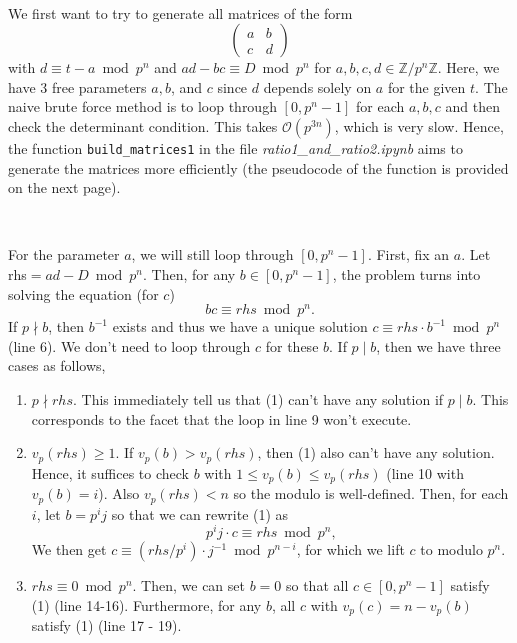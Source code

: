 \documentclass[letterpaper,12pt]{article}
\newcommand{\Z}{\mathbb{Z}}
\newcommand{\bigO}{\mathcal{O}}
\begin{document}
\

We first want to try to generate all matrices of the form 
\[
\begin{pmatrix}
a & b \\ c & d
\end{pmatrix}
\]
with $d \equiv t - a \bmod p^n$ and $ad - bc \equiv D \bmod p^n$ 
for $a,b,c,d \in \Z/p^n\Z$.
Here, we have 3 free parameters $a,b$, and $c$ since $d$ depends solely on $a$ for the given $t$.
The naive brute force method is to loop
through $[0, p^n-1]$ for each $a,b,c$ and then check the determinant condition.
This takes $\bigO(p^{3n})$, which is very slow.
Hence, the function \texttt{build\_matrices1} in the file 
\emph{ratio1\_and\_ratio2.ipynb} aims to 
generate the matrices more efficiently 
(the pseudocode of the function is provided on the next page).

\

For the parameter $a$, we will still loop through $[0, p^n-1]$.
First, fix an $a$.
Let rhs$ = ad-D \bmod p^n$.
Then, for any $b \in [0, p^n-1]$,
the problem turns into solving the equation (for $c$)
\begin{equation}
bc \equiv rhs \bmod p^n .
\end{equation}
If $p \nmid b$, then $b^{-1}$ exists and thus 
we have a unique solution
$c \equiv rhs \cdot b^{-1} \bmod p^n$ (line 6).
We don't need to loop through $c$ for these $b$.
If $p \mid b$, then we have three cases as follows,

\begin{enumerate}
\item $p \nmid rhs$. This immediately tell us that (1) can't have any solution 
if $p \mid b$. This corresponds to the facet that the loop in line 9 won't execute.

\item $v_p(rhs) \geq 1$.
If $v_p(b) > v_p(rhs)$, then (1) also can't have any solution.
Hence, it suffices to check $b$ with $1 \leq v_p(b) \leq v_p(rhs)$ (line 10 with $v_p(b) = i$).
Also $v_p(rhs) < n$ so the modulo is well-defined.
Then, for each $i$, let $b = p^i j$ so that we can rewrite (1) as 
\[
p^i j \cdot c \equiv rhs \bmod p^n,
\]
We then get $c \equiv (rhs / p^i) \cdot j^{-1} \bmod p^{n-i}$, 
for which we lift $c$ to modulo $p^n$.

\item $rhs \equiv 0 \bmod p^n$.
Then, we can set $b=0$ so that all $c \in [0, p^n-1]$ satisfy (1) (line 14-16).
Furthermore, for any $b$, 
all $c$ with $v_p(c) = n-v_p(b)$ satisfy (1) (line 17 - 19). 
\end{enumerate}
\end{document}
